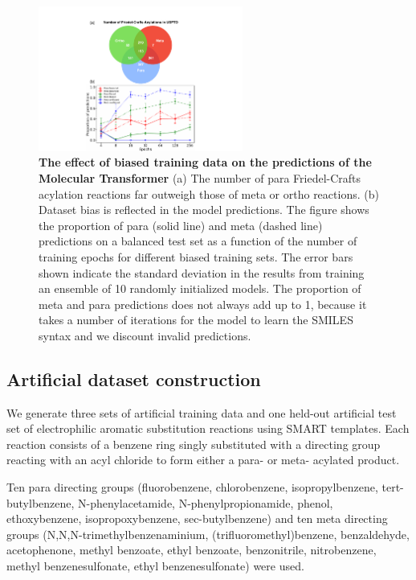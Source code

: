 \begin{figure}[htbp!] 
    \centering    
    \includegraphics[width=0.6\textwidth]{Chapters/Transformer/Figs/venn_toy.pdf}
    \caption{ \textbf{The effect of biased training data on the predictions of the Molecular Transformer} (a) The number of para Friedel-Crafts acylation reactions far outweigh those of meta or ortho reactions. (b) Dataset bias is reflected in the model predictions. The figure shows the proportion of para (solid line) and meta (dashed line) predictions on a balanced test set as a function of the number of training epochs for different biased training sets. The error bars shown indicate the standard deviation in the results from training an ensemble of 10 randomly initialized models. The proportion of meta and para predictions does not always add up to 1, because it takes a number of iterations for the model to learn the SMILES syntax and we discount invalid predictions.}
    \label{fig:venn_toy}
\end{figure}


\subsection{Artificial dataset construction}
We generate three sets of artificial training data and one held-out artificial test set of electrophilic aromatic substitution reactions using SMART templates. Each reaction consists of a benzene ring singly substituted with a directing group reacting with an acyl chloride to form either a para- or meta- acylated product. 

Ten para directing groups (fluorobenzene, chlorobenzene, isopropylbenzene, tert-butyl\-benzene, N-phenylacetamide, N-phenylpropionamide, phenol, ethoxybenzene, isopropoxybenzene, sec-butyl\-benzene) and ten meta directing groups (N,N,N-trimethylbenzenaminium, (trifluoromethyl)benzene, benzaldehyde, acetophenone, methyl benzoate, ethyl benzoate, benzonitrile, nitrobenzene, methyl benzenesulfonate, ethyl benzenesulfonate) were used.

